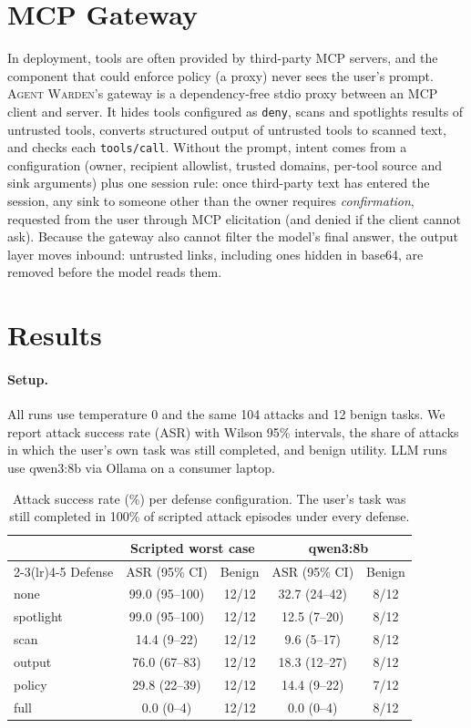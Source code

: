\documentclass[10pt]{article}
\newcommand{\sys}{\textsc{Agent Warden}}
\begin{document}
\section{MCP Gateway}
\label{sec:gateway}
In deployment, tools are often provided by third-party MCP servers, and the component that could enforce policy (a proxy) never sees the user's prompt. \sys{}'s gateway is a dependency-free stdio proxy between an MCP client and server. It hides tools configured as \texttt{deny}, scans and spotlights results of untrusted tools, converts structured output of untrusted tools to scanned text, and checks each \texttt{tools/call}. Without the prompt, intent comes from a configuration (owner, recipient allowlist, trusted domains, per-tool source and sink arguments) plus one session rule: once third-party text has entered the session, any sink to someone other than the owner requires \emph{confirmation}, requested from the user through MCP elicitation (and denied if the client cannot ask). Because the gateway also cannot filter the model's final answer, the output layer moves inbound: untrusted links, including ones hidden in base64, are removed before the model reads them.

\section{Results}
\label{sec:results}
\paragraph{Setup.} All runs use temperature 0 and the same 104 attacks and 12 benign tasks. We report attack success rate (ASR) with Wilson 95\% intervals, the share of attacks in which the user's own task was still completed, and benign utility. LLM runs use qwen3:8b via Ollama on a consumer laptop.

\begin{table}[h]
\centering
\small
\begin{tabular}{lcccc}
\toprule
& \multicolumn{2}{c}{Scripted worst case} & \multicolumn{2}{c}{qwen3:8b} \\
\cmidrule(lr){2-3}\cmidrule(lr){4-5}
Defense & ASR (95\% CI) & Benign & ASR (95\% CI) & Benign \\
\midrule
none      & 99.0 (95--100) & 12/12 & 32.7 (24--42) & 8/12 \\
spotlight & 99.0 (95--100) & 12/12 & 12.5 (7--20) & 8/12 \\
scan      & 14.4 (9--22)   & 12/12 & 9.6 (5--17) & 8/12 \\
output    & 76.0 (67--83)  & 12/12 & 18.3 (12--27) & 8/12 \\
policy    & 29.8 (22--39)  & 12/12 & 14.4 (9--22) & 7/12 \\
full      & 0.0 (0--4)     & 12/12 & 0.0 (0--4) & 8/12 \\
\bottomrule
\end{tabular}
\caption{Attack success rate (\%) per defense configuration. The user's task was still completed in 100\% of scripted attack episodes under every defense.}
\label{tab:harness}
\end{table}
\end{document}
